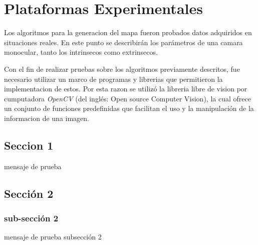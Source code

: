 \chapter{Plataformas Experimentales}
\label{capitulo4}

Los algoritmos para la generacion del mapa fueron probados datos adquiridos en situaciones reales. En este punto se describirán los parámetros de una camara monocular, tanto los intrinsecos como extrinsecos.

Con el fin de realizar pruebas sobre los algoritmos previamente descritos, fue necesario utilizar un marco de programas y librerias que permitieron la implementacion de estos. Por esta razon se utilizó la libreria libre de vision por cumputadora \textit{OpenCV} (del inglés: Open source Computer Vision), la cual ofrece un conjunto de funciones predefinidas que facilitan el uso y la manipulación de la informacion de una imagen.


\section{Seccion 1}
mensaje de prueba

\section{Sección 2}
\subsection{sub-sección 2}
mensaje de prueba subsección 2


